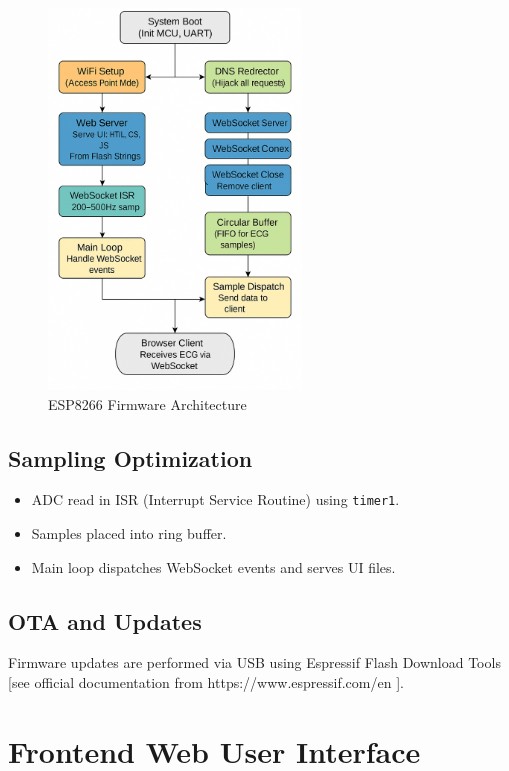 \begin{figure}[H]
\centering
\includegraphics[width=0.6\textwidth]{images/firmware-diagram(8266).png}
\caption{ESP8266 Firmware Architecture}
\label{fig:firm8266_diagram}
\end{figure}


\section{Sampling Optimization}
\begin{itemize}
    \item ADC read in ISR (Interrupt Service Routine) using \texttt{timer1}.
    \item Samples placed into ring buffer.
    \item Main loop dispatches WebSocket events and serves UI files.
\end{itemize}

\section{OTA and Updates}
Firmware updates are performed via USB using Espressif Flash Download Tools [see official documentation from https://www.espressif.com/en ].






\chapter{Frontend Web User Interface}

